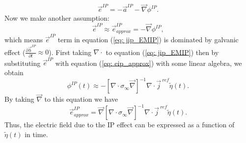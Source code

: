 \documentclass[a4paper, 11pt]{article}
\renewcommand{\div}{\nabla\cdot}
\newcommand{\grad}{\vec \nabla}
\newcommand{\siginf}{\sigma_\infty}
\renewcommand {\j}  { {\vec j} }
\renewcommand {\b}  { {\vec b} }
\newcommand {\e}  { {\vec e} }
\newcommand{\peta}{\tilde{\eta}}
\begin{document}
\begin{equation}
  \e^{IP}=-\vec{a}^{IP}-\grad\phi^{IP}.
\end{equation}
Now we make another assumption:
\begin{equation}
  \e^{IP} \approx  \e^{IP}_{approx} = -\grad\phi^{IP},
  \label{eq: eip_approx}
\end{equation}
which means $\e^{IP}$ term in equation (\ref{eq: jip_EMIP}) is dominated by galvanic effect ($\frac{\partial\b^{IP}}{\partial t}\approx 0$). First taking $\div$ to equation (\ref{eq: jip_EMIP}) then by substituting  $\e^{IP}$ with equation (\ref{eq: eip_approx}) with some linear algebra, we obtain
\begin{equation}
  \phi^{IP}(t) \approx -[\div \siginf\grad]^{-1}\div\j^{\ ref}\peta(t).
  \label{eq: phiIPapprox_general}
\end{equation}
By taking $\grad$ to this equation we have
\begin{equation}
    \e^{IP}_{approx} = \grad[\div \siginf\grad]^{-1}\div\j^{\ ref}\peta(t).
    \label{eq: eip_approx_full}
\end{equation}
Thus, the electric field due to the IP effect can be expressed as a function of $\peta(t)$ in time.
\end{document}
